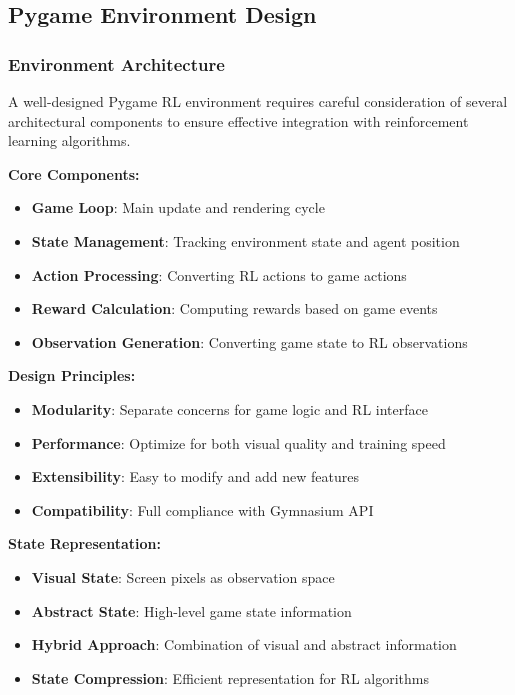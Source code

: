 \documentclass[12pt]{article}
\begin{document}
{{{\subsection{Pygame Environment Design}

\subsubsection{Environment Architecture}

A well-designed Pygame RL environment requires careful consideration of several architectural components to ensure effective integration with reinforcement learning algorithms.

\textbf{Core Components:}
\begin{itemize}
    \item \textbf{Game Loop}: Main update and rendering cycle
    \item \textbf{State Management}: Tracking environment state and agent position
    \item \textbf{Action Processing}: Converting RL actions to game actions
    \item \textbf{Reward Calculation}: Computing rewards based on game events
    \item \textbf{Observation Generation}: Converting game state to RL observations
\end{itemize}

\textbf{Design Principles:}
\begin{itemize}
    \item \textbf{Modularity}: Separate concerns for game logic and RL interface
    \item \textbf{Performance}: Optimize for both visual quality and training speed
    \item \textbf{Extensibility}: Easy to modify and add new features
    \item \textbf{Compatibility}: Full compliance with Gymnasium API
\end{itemize}

\textbf{State Representation:}
\begin{itemize}
    \item \textbf{Visual State}: Screen pixels as observation space
    \item \textbf{Abstract State}: High-level game state information
    \item \textbf{Hybrid Approach}: Combination of visual and abstract information
    \item \textbf{State Compression}: Efficient representation for RL algorithms
\end{itemize}

}}}
\end{document}

